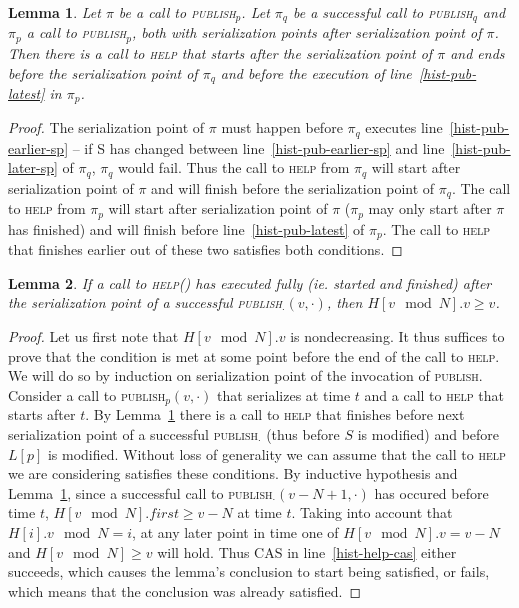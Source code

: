 \documentclass[a4paper,11pt]{article}
\newtheorem{lemma}{Lemma}
\newcommand{\fn}[1]{\textsc{#1}}
\begin{document}
\begin{lemma}\label{lem-hist-help-comes}
Let $\pi$ be a call to \fn{publish$_p$}. Let $\pi_q$ be a successful call to \fn{publish$_q$} and $\pi_p$ a call to \fn{publish$_p$}, both with serialization points after serialization point of $\pi$. Then there is a call to \fn{help} that starts after the serialization point of $\pi$ and ends before the serialization point of $\pi_q$ and 
before the execution of line~\ref{hist-pub-latest} in $\pi_p$.
\end{lemma}
\begin{proof}
The serialization point of $\pi$ must happen before $\pi_q$ executes line~\ref{hist-pub-earlier-sp} -- if S has changed between line~\ref{hist-pub-earlier-sp} and line~\ref{hist-pub-later-sp} of $\pi_q$, $\pi_q$ would fail.
Thus the call to \fn{help} from $\pi_q$ will start after serialization point of $\pi$ and will finish before the serialization point of $\pi_q$. The call to \fn{help}
from $\pi_p$ will start after serialization point of $\pi$ ($\pi_p$ may only start after $\pi$ has finished) and will finish before line~\ref{hist-pub-latest} of $\pi_p$.
The call to \fn{help} that finishes earlier out of these two satisfies both conditions.
\end{proof}

\begin{lemma}
\label{lem-hist-is-complete}
If a call to \fn{help}() has executed fully (ie. started and finished) after the serialization point of a successful \fn{publish$_\cdot$}$(v, \cdot)$, then $H[v\mod N].v \geq v$.
\end{lemma}
\begin{proof}
Let us first note that $H[v\mod N].v$ is nondecreasing.
It thus suffices to prove that the condition is met at some point before the end of the call to \fn{help}. We will do so by induction on serialization point of the invocation of \fn{publish}.
Consider a call to \fn{publish$_p$}$(v, \cdot)$ that serializes at time $t$ and a call to \fn{help} that starts after $t$. By Lemma~\ref{lem-hist-help-comes} there is a call to \fn{help} that finishes before next serialization point of a successful \fn{publish$_\cdot$} (thus before $S$
is modified) and before $L[p]$ is modified. Without loss of generality we can assume that the call to \fn{help} we are considering satisfies these conditions. By inductive hypothesis and Lemma~\ref{lem-hist-help-comes}, since a successful call to \fn{publish$_\cdot$}$(v-N+1, \cdot)$ has occured before time $t$, $H[v \mod N].first \geq v-N$ at time $t$. Taking into account that $H[i].v \mod N = i$, at any later point in time one of $H[v \mod N].v = v-N$ and $H[v \mod N] \geq v$ will hold.
Thus CAS in line~\ref{hist-help-cas} either succeeds, which causes the lemma's conclusion to start being satisfied, or fails, which means that the conclusion was already satisfied.
\end{proof} %
\end{document}

